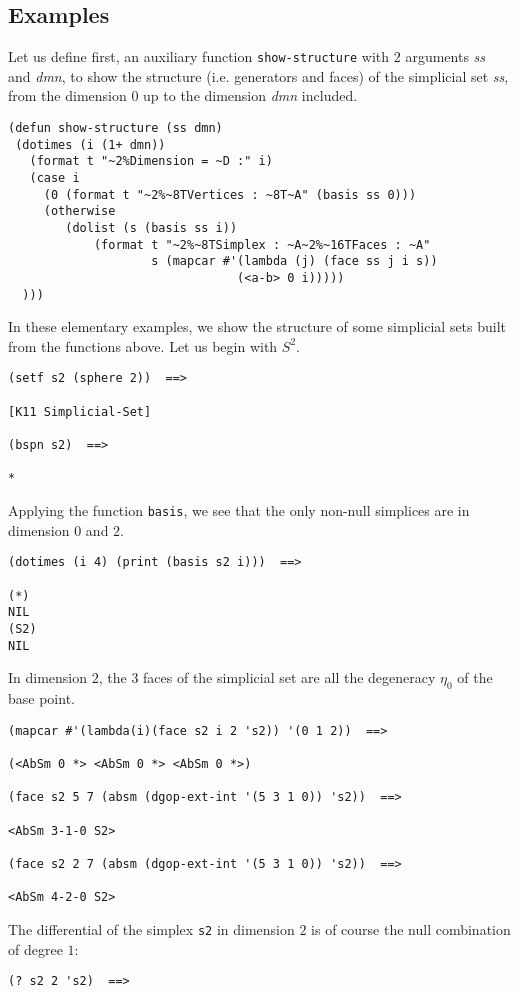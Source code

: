 {\subsection*{Examples}

Let us define first, an auxiliary function {\tt show-structure}
with $2$ arguments {\em ss} and {\em dmn},
to show the structure (i.e. generators and faces) of the simplicial set  {\em ss},
from the dimension $0$ up to the dimension {\em dmn} included.
{\footnotesize\begin{verbatim}
(defun show-structure (ss dmn)
 (dotimes (i (1+ dmn))
   (format t "~2%Dimension = ~D :" i)
   (case i
     (0 (format t "~2%~8TVertices : ~8T~A" (basis ss 0)))
     (otherwise
        (dolist (s (basis ss i))
            (format t "~2%~8TSimplex : ~A~2%~16TFaces : ~A"
                    s (mapcar #'(lambda (j) (face ss j i s))
                                (<a-b> 0 i)))))
  )))
\end{verbatim}}
In these elementary examples, we show the structure of some simplicial sets built
from the functions above. Let us begin with $S^2$.

{\footnotesize\begin{verbatim}
(setf s2 (sphere 2))  ==>

[K11 Simplicial-Set]

(bspn s2)  ==>

*
\end{verbatim}}
Applying the function {\tt basis}, we see that the only non-null simplices are in dimension $0$
and $2$.
{\footnotesize\begin{verbatim}
(dotimes (i 4) (print (basis s2 i)))  ==>

(*)
NIL
(S2)
NIL
\end{verbatim}}
In dimension $2$, the $3$ faces of the simplicial set are all the degeneracy $\eta_0$
of the base point.
{\footnotesize\begin{verbatim}
(mapcar #'(lambda(i)(face s2 i 2 's2)) '(0 1 2))  ==>

(<AbSm 0 *> <AbSm 0 *> <AbSm 0 *>)

(face s2 5 7 (absm (dgop-ext-int '(5 3 1 0)) 's2))  ==>

<AbSm 3-1-0 S2>

(face s2 2 7 (absm (dgop-ext-int '(5 3 1 0)) 's2))  ==>

<AbSm 4-2-0 S2>
\end{verbatim}}
The differential of the simplex {\tt s2} in dimension $2$ is of course the null combination
of degree $1$:
{\footnotesize\begin{verbatim}
(? s2 2 's2)  ==>


\end{verbatim}}}
